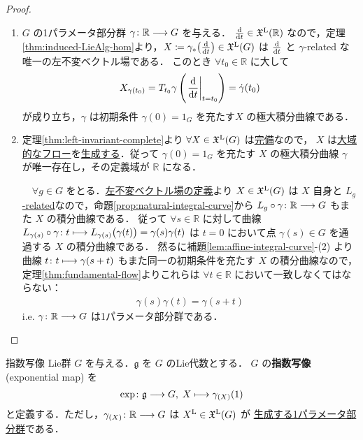 \documentclass[geometry_main]{subfiles}
\begin{document}
\begin{proof}
    \begin{enumerate}
        \item $G$ の1パラメータ部分群 $\gamma \colon \mathbb{R} \longrightarrow G$ を与える．
        $\dv{}{t} \in \mathfrak{X}^{\mathrm{L}}(\mathbb{R})$ なので，定理\ref{thm:induced-LieAlg-hom}より，$X \coloneqq \gamma_* \bigl(\dv{}{t}\bigr) \in \mathfrak{X}^{\mathrm{L}}(G)$ は $\dv{}{t}$ と $\gamma$-related な唯一の左不変ベクトル場である．
        このとき $\forall t_0 \in \mathbb{R}$ に大して
        \begin{align}
            X_{\gamma(t_0)} = T_{t_0} \gamma \left( \eval{\dv{}{t}}_{t=t_0} \right) = \dot{\gamma}(t_0)
        \end{align}
        が成り立ち，$\gamma$ は初期条件 $\gamma(0) = 1_G$ を充たす$X$ の極大積分曲線である．
        \item 定理\ref{thm:left-invariant-complete}より $\forall X \in \mathfrak{X}^{\mathrm{L}}(G)$ は\hyperref[def:complete-vecf]{完備}なので，
        $X$ は\hyperref[def:global-flow]{大域的なフロー}を\hyperref[thm:fundamental-flow]{生成する}．従って $\gamma(0) = 1_G$ を充たす $X$ の極大積分曲線 $\gamma$ が唯一存在し，その定義域が $\mathbb{R}$ になる．
        
        　$\forall g \in G$ をとる．\hyperref[def:left-invariant]{左不変ベクトル場の定義}より $X \in \mathfrak{X}^{\mathrm{L}}(G)$ は $X$ 自身と \hyperref[def:F-related]{$L_g$-related}なので，命題\ref{prop:natural-integral-curve}から $L_g \circ \gamma \colon \mathbb{R} \longrightarrow G$ もまた $X$ の積分曲線である．
        従って $\forall s \in \mathbb{R}$ に対して曲線 $L_{\gamma(s)} \circ \gamma \colon t \longmapsto L_{\gamma(s)} \bigl( \gamma(t) \bigr) = \gamma(s) \gamma(t)$ は $t=0$ において点 $\gamma(s) \in G$ を通過する $X$ の積分曲線である．
        然るに補題\ref{lem:affine-integral-curve}-(2) より曲線 $t \colon t \longmapsto \gamma(s+t)$ もまた同一の初期条件を充たす $X$ の積分曲線なので，定理\ref{thm:fundamental-flow}よりこれらは $\forall t \in \mathbb{R}$ において一致しなくてはならない：
        \begin{align}
            \gamma(s) \gamma(t) = \gamma(s+t)
        \end{align}
        i.e. $\gamma \colon \mathbb{R} \longrightarrow G$ は1パラメータ部分群である．
    \end{enumerate}
    
\end{proof}

\begin{mydef}[label=def:exp]{指数写像}
    Lie群 $G$ を与える．$\mathfrak{g}$ を $G$ のLie代数とする．
    $G$ の\textbf{指数写像} (exponential map) を
    \begin{align}
        \exp \colon \mathfrak{g} \longrightarrow G,\; X \longmapsto \gamma_{(X)}(1)
    \end{align}
    と定義する．ただし，$\gamma_{(X)} \colon \mathbb{R} \longrightarrow G$ は $X^{\mathrm{L}} \in \mathfrak{X}^{\mathrm{L}}(G)$ が \hyperref[prop:one-parameter-basic]{生成する1パラメータ部分群}である．
\end{mydef}
\end{document}
